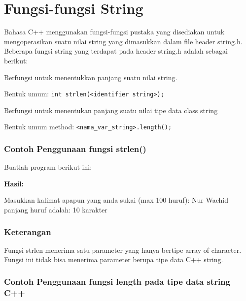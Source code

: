 {{\section{Fungsi-fungsi String}\label{fungsi-fungsi-string}

Bahasa C++ menggunakan fungsi-fungsi pustaka yang disediakan untuk
mengoperasikan suatu nilai string yang dimasukkan dalam file header
string.h. Beberapa fungsi string yang terdapat pada header string.h
adalah sebagai berikut:



Berfungsi untuk menentukkan panjang suatu nilai string.

Bentuk umum:
\texttt{int\ strlen(\textless{}identifier\ string\textgreater{});}



Berfungsi untuk menentukan panjang suatu nilai tipe data class string

Bentuk umum method:
\texttt{\textless{}nama\_var\_string\textgreater{}.length();}

\subsubsection*{Contoh Penggunaan fungsi strlen()}

Buatlah program berikut ini:



\textbf{Hasil:}

\begin{lcverbatim}
Masukkan kalimat apapun
yang anda sukai (max 100 huruf): Nur Wachid
panjang huruf adalah: 10 karakter
\end{lcverbatim}


\subsubsection*{Keterangan}

Fungsi strlen menerima satu parameter yang hanya bertipe array of
character. Fungsi ini tidak bisa menerima parameter berupa tipe data C++
string.

\subsubsection*{Contoh Penggunaan fungsi length pada tipe data string C++}

}}
